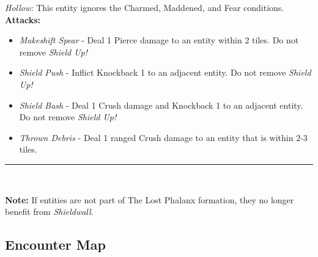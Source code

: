 \emph{Hollow:} This entity ignores the Charmed, Maddened, and Fear conditions.\\

\textbf{Attacks:}
\begin{itemize}
\item \emph{Makeshift Spear} - Deal 1 Pierce damage to an entity within 2 tiles. Do not remove \emph{Shield Up!}
\item \emph{Shield Push} - Inflict Knockback 1 to an adjacent entity. Do not remove \emph{Shield Up!}
\item \emph{Shield Bash} - Deal 1 Crush damage and Knockback 1 to an adjacent entity. Do not remove \emph{Shield Up!}
\item \emph{Thrown Debris} - Deal 1  ranged Crush damage to an entity that is within 2-3 tiles.
\end{itemize}
\hrule
\ \\

\begin{tcolorbox}
\textbf{Note:} If entities are not part of The Lost Phalanx formation, they no longer benefit from \emph{Shieldwall}.
\end{tcolorbox}

\pagebreak

\subsection*{Encounter Map}
\begin{center}
\end{center}

